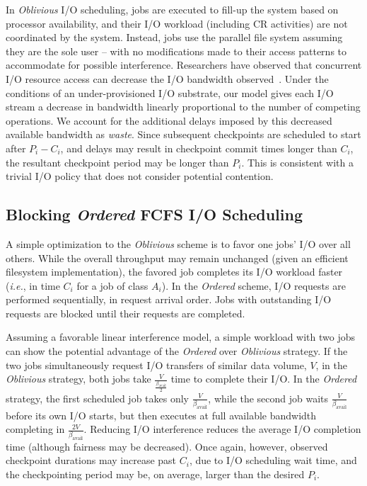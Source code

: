 \documentclass[two]{article}
\newcommand{\ie}[0]{\emph{i.e.}\xspace}
\newcommand{\bandavail}{\beta_{\text{avail}}}
\newcommand{\app}[1]{A_{#1}}
\newcommand{\period}[1]{P_{#1}}
\newcommand{\ckpt}[1]{C_{#1}}
\newcommand{\nocoop}{\emph{Oblivious}\xspace}
\newcommand{\fifoblock}{\emph{Ordered}\xspace}
\def\propfixed{\nocoop-Fixed\xspace}
\def\propdaly{\nocoop-Daly\xspace}
\begin{document}
In \nocoop I/O scheduling, jobs are executed to fill-up the system based on
processor availability, and their I/O workload (including CR activities) are
not coordinated by the system.  Instead, jobs use the parallel file system
assuming they are the sole user -- with no modifications made to their access
patterns to accommodate for possible interference. Researchers have observed
that concurrent I/O resource access can decrease the I/O bandwidth
observed~\cite{Dorier2015}.  Under the conditions of an under-provisioned I/O
substrate, our model gives each I/O stream a decrease in bandwidth linearly
proportional to the number of competing operations.  We account for the
additional delays imposed by this decreased available bandwidth as
\emph{waste}.  Since subsequent checkpoints are scheduled to start after
$\period{i}-\ckpt{i}$, and delays may result in checkpoint commit times longer
than $\ckpt{i}$, the resultant checkpoint period may be longer than
$\period{i}$. This is consistent with a trivial I/O policy that does not
consider potential contention.


\subsection{Blocking \fifoblock FCFS I/O Scheduling}
\label{sec:fcfsblock}

A simple optimization to the \nocoop scheme is to favor one jobs' I/O over all
others. While the overall throughput may remain unchanged (given an efficient
filesystem implementation), the favored job completes its I/O workload faster
(\ie, in time $\ckpt{i}$ for a job of class $\app{i}$).  In the \fifoblock
scheme, I/O requests are performed sequentially, in request arrival order. Jobs
with outstanding I/O requests are blocked until their requests are completed.

Assuming a favorable linear interference model, a simple workload with two jobs
can show the potential advantage of the \fifoblock over \nocoop strategy.  If
the two jobs simultaneously request I/O transfers of similar data volume, $V$,
in the \nocoop strategy, both jobs take $\frac{V}{\frac{\bandavail}{2}}$ time
to complete their I/O.  In the \fifoblock strategy, the first scheduled job
takes only $\frac{V}{\bandavail}$, while the second job waits
$\frac{V}{\bandavail}$ before its own I/O starts, but then executes at full
available bandwidth completing in $\frac{2V}{\bandavail}$.  Reducing I/O
interference reduces the average I/O completion time (although fairness may be
decreased).  Once again, however, observed checkpoint durations may increase
past $\ckpt{i}$, due to I/O scheduling wait time, and the checkpointing period
may be, on average, larger than the desired $\period{i}$.
\end{document}
